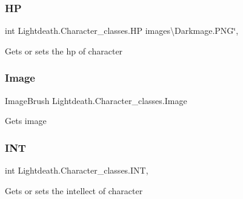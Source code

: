 \subsubsection{\texorpdfstring{HP}{HP}}
{\footnotesize\ttfamily int Lightdeath.\+Character\+\_\+classes.\+HP images\textbackslash{}\+Darkmage.\+P\+NG\char`\"{}\hspace{0.3cm}{\ttfamily [get]}, {\ttfamily [set]}}



Gets or sets the hp of character 

\hypertarget{class_lightdeath_1_1_character__classes_af2bf8374841d6678dd1258c8e6326ed5}{}\label{class_lightdeath_1_1_character__classes_af2bf8374841d6678dd1258c8e6326ed5} 
\subsubsection{\texorpdfstring{Image}{Image}}
{\footnotesize\ttfamily Image\+Brush Lightdeath.\+Character\+\_\+classes.\+Image\hspace{0.3cm}{\ttfamily [get]}}



Gets image 

\hypertarget{class_lightdeath_1_1_character__classes_a2555df99f37ef0a5524dfc4a5de49ab7}{}\label{class_lightdeath_1_1_character__classes_a2555df99f37ef0a5524dfc4a5de49ab7} 
\subsubsection{\texorpdfstring{I\+NT}{INT}}
{\footnotesize\ttfamily int Lightdeath.\+Character\+\_\+classes.\+I\+NT\hspace{0.3cm}{\ttfamily [get]}, {\ttfamily [set]}}



Gets or sets the intellect of character 

\hypertarget{class_lightdeath_1_1_character__classes_ab275150674dd14bbd1ae24b1806ce2ae}{}\label{class_lightdeath_1_1_character__classes_ab275150674dd14bbd1ae24b1806ce2ae} 

